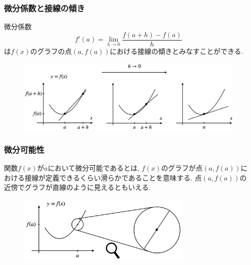 \documentclass[dvipdfmx,cjk,10.2pt]{beamer}
\theoremstyle{definition}
\begin{document}
\begin{frame}
\frametitle{微分係数と接線の傾き}

微分係数
$$
f'(a)=
\lim_{h\to 0} \frac{f(a+h)-f(a)}{h}
$$
は$f(x)$のグラフの点$(a,f(a))$における接線の傾きとみなすことができる. 
 

 \begin{figure}[htbp]
 \begin{center} 
  \includegraphics[width=120mm]{tangent.png}
 \end{center}
\end{figure}


\end{frame}


\begin{frame}
\frametitle{微分可能性}

関数$f(x)$が$a$において微分可能であるとは, $f(x)$のグラフが点$(a,f(a))$における接線が定義できるくらい滑らかであることを意味する. 
点$(a,f(a))$の近傍でグラフが直線のように見えるともいえる.  


 \begin{figure}[htbp]
 \begin{center} 
  \includegraphics[width=85mm]{differentiable2.png}
 \end{center}
\end{figure}

\end{frame}



\end{document}
